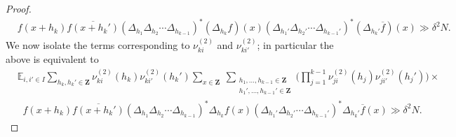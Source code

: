 \documentclass[11pt,reqno]{amsart}
\numberwithin{equation}{section}
\theoremstyle{definition}
\theoremstyle{remark}
\newcommand{\mb}{\mathbb}
\newcommand{\ol}{\overline}
\newcommand\Z{\mathbf{Z}}
\newcommand\E{\mb{E}}
\begin{document}
\begin{proof}
\begin{align*}
& f(x+h_k)\overline{f(x+h_k')}(\Delta_{h_1}\Delta_{h_2}\cdots \Delta_{h_{k-1}})^{\ast}(\Delta_{h_k}f)(x)(\Delta_{h_1'}\Delta_{h_2'}\cdots \Delta_{h_{k-1}'})^{\ast}(\Delta_{h_k'}\ol{f})(x)\gg \delta^2 N.
\end{align*}
We now isolate the terms corresponding to $\nu^{(2)}_{ki}$ and $\nu^{(2)}_{ki'}$; in particular the above is equivalent to
\begin{align}\nonumber
& \E_{i,i'\in I}\sum_{h_k,h_k'\in \Z}\nu^{(2)}_{ki}(h_k)\nu^{(2)}_{ki'}(h_k')\sum_{x\in \Z}~\sum_{\substack{h_1,\ldots,h_{k-1}\in \Z\\h_1',\ldots,h_{k-1}'\in \Z}}\bigg(\prod_{j=1}^{k-1}\nu^{(2)}_{ji}(h_j)\nu^{(2)}_{ji'}(h_j')\bigg) \times \\
&\; \; f(x+h_k)\ol{f(x+h_k')}(\Delta_{h_1}\Delta_{h_2}\cdots \Delta_{h_{k-1}})^{\ast}\Delta_{h_k}f(x)(\Delta_{h_1'}\Delta_{h_2'}\cdots \Delta_{h_{k-1}'})^{\ast}\Delta_{h_k'}\ol{f}(x)\gg \delta^2 N.
\label{b332}\end{align}


\end{proof}
\end{document}
